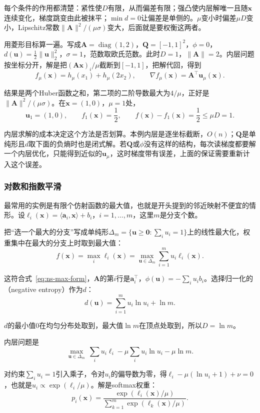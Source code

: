 每个条件的作用都清楚：紧性使$D$有限，从而偏差有限；强凸使内层解唯一且随$\bm{x}$连续变化，梯度跳变由此被抹平；$\min d=0$让偏差是单侧的。$\mu$变小时偏差$\mu D$变小，Lipschitz常数$\lVert\bm{A}\rVert^2/(\mu\sigma)$变大，后面就是要权衡这两者。

用菱形目标算一遍。写成$\bm{A}=\operatorname{diag}(1,2)$，$\bm{Q}=[-1,1]^2$，$\phi=0$，$d(\bm{u})=\tfrac12\lVert\bm{u}\rVert_2^2$，$\sigma=1$，范数取欧氏范数。此时$D=1$，$\lVert\bm{A}\rVert=2$。内层问题按坐标分开，解是把$(\bm{A}\bm{x})_i/\mu$截断到$[-1,1]$，把解代回，得到
\[
 f_\mu(\bm{x})=h_\mu(x_1)+h_\mu(2x_2),\qquad\nabla f_\mu(\bm{x})=\bm{A}^\top\bm{u}_\mu(\bm{x}).
\]

结果是两个Huber函数之和，第二项的二阶导数最大为$4/\mu$，正好是$\lVert\bm{A}\rVert^2/(\mu\sigma)$。在$\bm{x}=(1,0)$，$\mu=1$处，
\[
 \bm{u}_1=(1,0),\qquad f_1(\bm{x})=\frac12,\qquad f(\bm{x})-f_1(\bm{x})=\frac12\leq\mu D=1.
\]

内层求解的成本决定这个方法是否划算。本例内层是逐坐标截断，$O(n)$；$\bm{Q}$是单纯形且$d$取下面的负熵时也是闭式解。若$\bm{Q}$或$\phi$没有这样的结构，每次读梯度都要解一个内层优化，只能得到近似的$\bm{u}_\mu$，这时梯度带有误差，上面的保证需要重新计入这个误差。

\subsubsection{对数和指数平滑}
\label{sec:ns-log-sum-exp}

最常用的实例是有限个仿射函数的最大值，也就是开头提到的邻近映射不便宜的情形。设$\ell_i(\bm{x})=\langle\bm{a}_i,\bm{x}\rangle+b_i$，$i=1,\ldots,m$，这里$m$是分支个数。

把“选一个最大的分支”写成单纯形$\Delta_m=\{\bm{u}\geq\bm{0}:\sum_iu_i=1\}$上的线性最大化，权重集中在最大的分支上时取到最大值：
\[
 f(\bm{x})=\max_i\ell_i(\bm{x})=\max_{\bm{u}\in\Delta_m}\sum_{i=1}^mu_i\ell_i(\bm{x}).
\]

这符合式~\eqref{eq:ns-max-form}，$\bm{A}$的第$i$行是$\bm{a}_i^\top$，$\phi(\bm{u})=-\sum_iu_ib_i$。选择归一化的（negative entropy）作为$d$：
\[
 d(\bm{u})=\sum_{i=1}^mu_i\ln u_i+\ln m.
\]

$d$的最小值$0$在均匀分布处取到，最大值$\ln m$在顶点处取到，所以$D=\ln m$。

内层问题是
\[
 \max_{\bm{u}\in\Delta_m}\ \sum_iu_i\ell_i-\mu\sum_iu_i\ln u_i-\mu\ln m.
\]

对约束$\sum_iu_i=1$引入乘子，令对$u_i$的偏导数为零，得$\ell_i-\mu(\ln u_i+1)+\nu=0$，也就是$u_i\propto\exp(\ell_i/\mu)$。解是softmax权重：
\begin{equation}
 p_i(\bm{x})=\frac{\exp(\ell_i(\bm{x})/\mu)}{\sum_{k=1}^m\exp(\ell_k(\bm{x})/\mu)}.
 \label{eq:ns-softmax}
\end{equation}

